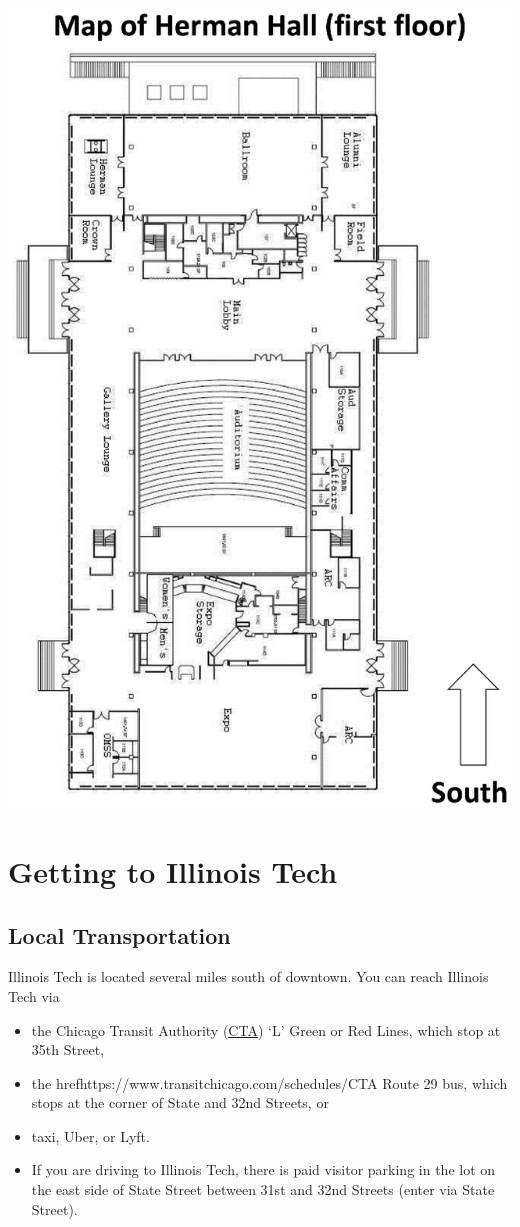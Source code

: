 \begin{center}
	\includegraphics[width =0.95 \textwidth] {Photos/MapHermannHallFirstFloor_cropped.eps}
\end{center}
\clearpage

\section{Getting to Illinois Tech}

\subsection{Local Transportation}
Illinois Tech is located several miles south of downtown.  You  can reach Illinois Tech via
\begin{itemize}
	\item the Chicago Transit Authority (\href{https://www.transitchicago.com/schedules/}{CTA}) `L' Green or Red Lines, which stop at 35th Street,
	\item the href{https://www.transitchicago.com/schedules/}{CTA} Route 29 bus, which stops at the corner of State and 32nd Streets, or
	\item taxi, Uber, or Lyft.
	 \item If you are driving to Illinois Tech, there is paid visitor parking in the lot on the east side of State Street between 31st and 32nd Streets (enter via State Street).
\end{itemize}

